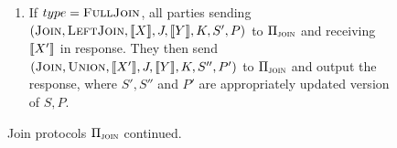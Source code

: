 \begin{figure}[ht]
{\begin{minipage}{0.95\linewidth}
\begin{enumerate}
				For $i\in [n+1,2n], \share{\ZNull}[i]:= \share{\YNull}[i] \vee \neg \share{\XNull}[i] \vee \neg P(\Null, \share{Y'}[i])$ and $\share{Z}[i]:=S(\Null, \share{Y'}[i])$.
				
				\item If  $type=\textsc{FullJoin}$, all parties sending $(\textsc{Join}, \textsc{LeftJoin}, \llbracket X\rrbracket, J, \llbracket Y\rrbracket, K, S', P)$ to $\Pi_{\textsc{join}}$ and receiving $\llbracket X'\rrbracket$ in response. They then send $(\textsc{Join}, \textsc{Union}, \llbracket X'\rrbracket, J, \llbracket Y\rrbracket, K, S'', P')$  to $\Pi_{\textsc{join}}$ and output the response, where $S',S''$ and $P'$ are appropriately updated version of $S,P$.
			\end{enumerate}
	\end{minipage}}
	\caption{Join protocols $\Pi_{\textsc{join}}$ continued.}
	\label{fig:full_proto2}	
\end{figure}



